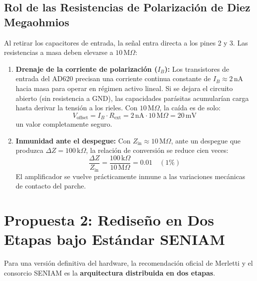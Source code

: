 \documentclass[11pt,a4paper]{article}
\begin{document}
\subsection{Rol de las Resistencias de Polarización de Diez Megaohmios}
Al retirar los capacitores de entrada, la señal entra directa a los pines 2 y 3. Las resistencias a masa deben elevarse a $10\,\text{M}\Omega$:
\begin{enumerate}
    \item \textbf{Drenaje de la corriente de polarización (\(I_B\)):} Los transistores de entrada del AD620 precisan una corriente continua constante de $I_B \approx 2\,\text{nA}$ hacia masa para operar en régimen activo lineal. Si se dejara el circuito abierto (sin resistencia a GND), las capacidades parásitas acumularían carga hasta derivar la tensión a los rieles. Con $10\,\text{M}\Omega$, la caída es de solo:
    \begin{equation}
    V_{\text{offset}} = I_B \cdot R_{\text{ext}} = 2\,\text{nA} \cdot 10\,\text{M}\Omega = 20\,\text{mV}
    \end{equation}
    un valor completamente seguro.
    \item \textbf{Inmunidad ante el despegue:} Con $Z_{\text{in}} \approx 10\,\text{M}\Omega$, ante un despegue que produzca $\Delta Z = 100\,\text{k}\Omega$, la relación de conversión se reduce cien veces:
    \begin{equation}
    \frac{\Delta Z}{Z_{\text{in}}} = \frac{100\,\text{k}\Omega}{10\,\text{M}\Omega} = 0.01 \quad (1\%)
    \end{equation}
    El amplificador se vuelve prácticamente inmune a las variaciones mecánicas de contacto del parche.
\end{enumerate}

\section{Propuesta 2: Rediseño en Dos Etapas bajo Estándar SENIAM}

Para una versión definitiva del hardware, la recomendación oficial de Merletti y el consorcio SENIAM es la \textbf{arquitectura distribuida en dos etapas}.
\end{document}
